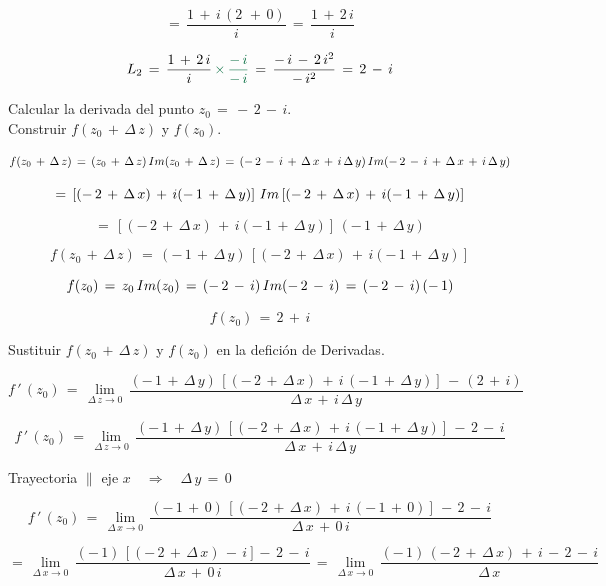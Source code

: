 \documentclass[a4paper,11pt,openany]{book}
\begin{document}
$$=\,\dfrac{1\,+\,i\,(2\,\,+\,0)}{i}\,=\,\dfrac{1\,+\,2\,i}{i}$$

$$L_{2}\,=\,\dfrac{1\,+\,2\,i}{i}\,\textcolor{cadmiumgreen}{\times\,\dfrac{-\,i}{-\,i}}\,=\,\dfrac{-\,i\,-\,2\,i^{2}}{-\,i^{2}}\,=\,2\,-\,i$$

\textcolor{ao(english)}{} Calcular la derivada del punto $z_{0}\,=\,-\,2\,-\,i$.\\

\textcolor{ao(english)}{} Construir $f(z_{0}\,+\,\Delta\,z)$ y $f(z_{0})$.

$$f(z_{0}\,+\,\Delta\,z)\,=\,(z_{0}\,+\,\Delta\,z)\,\mathnormal{Im}(z_{0}\,+\,\Delta\,z)\,=\,(-\,2\,-\,i\,+\,\Delta\,x\,+\,i\,\Delta\,y)\,\mathnormal{Im}(-\,2\,-\,i\,+\,\Delta\,x\,+\,i\,\Delta\,y)$$

$$=\,\left[(-\,2\,+\,\Delta\,x)\,+\,i(-\,1\,+\,\Delta\,y)\right]\,\mathnormal{Im}\left[(-\,2\,+\,\Delta\,x)\,+\,i(-\,1\,+\,\Delta\,y)\right]$$

$$=\,\left[(-\,2\,+\,\Delta\,x)\,+\,i(-\,1\,+\,\Delta\,y)\right]\,(-\,1\,+\,\Delta\,y)$$

$$f(z_{0}\,+\,\Delta\,z)\,=\,(-\,1\,+\,\Delta\,y)\,\left[(-\,2\,+\,\Delta\,x)\,+\,i(-\,1\,+\,\Delta\,y)\right]$$

$$f(z_{0})\,=\,z_{0}\,\mathnormal{Im}(z_{0})\,=\,(-\,2\,-\,i)\,\mathnormal{Im}(-\,2\,-\,i)\,=\,(-\,2\,-\,i)\,(-\,1)$$

$$f(z_{0})\,=\,2\,+\,i$$

\textcolor{ao(english)}{} Sustituir  $f(z_{0}\,+\,\Delta\,z)$ y $f(z_{0})$ en la defición de Derivadas.

$$f\,'\,(z_{0})\,=\,\displaystyle\lim_{\Delta\,z \to 0}\,\dfrac{(-\,1\,+\,\Delta\,y)\,\left[(-\,2\,+\,\Delta\,x)\,+\,i\,(-\,1\,+\,\Delta\,y)\right]\,-\,(2\,+\,i)}{\Delta\,x\,+\,i\,\Delta\,y}$$

$$f\,'\,(z_{0})\,=\,\displaystyle\lim_{\Delta\,z \to 0}\,\dfrac{(-\,1\,+\,\Delta\,y)\,\left[(-\,2\,+\,\Delta\,x)\,+\,i\,(-\,1\,+\,\Delta\,y)\right]\,-\,2\,-\,i}{\Delta\,x\,+\,i\,\Delta\,y}$$

\textcolor{ao(english)}{} Trayectoria $\parallel$ eje $x \quad\Rightarrow\quad \Delta\,y\,=\,0$

$$f\,'\,(z_{0})\,=\,\displaystyle\lim_{\Delta\,x \to 0}\,\dfrac{(-\,1\,+\,0)\,\left[(-\,2\,+\,\Delta\,x)\,+\,i\,(-\,1\,+\,0)\right]\,-\,2\,-\,i}{\Delta\,x\,+\,0\,i}$$

$$=\,\displaystyle\lim_{\Delta\,x \to 0}\,\dfrac{(-\,1)\,\left[(-\,2\,+\,\Delta\,x)\,-\,i\right]-\,2\,-\,i}{\Delta\,x\,+\,0\,i}\,=\,\displaystyle\lim_{\Delta\,x \to 0}\,\dfrac{(-\,1)\,(-\,2\,+\,\Delta\,x)\,+\,i\,-\,2\,-\,i}{\Delta\,x}$$
\end{document}
